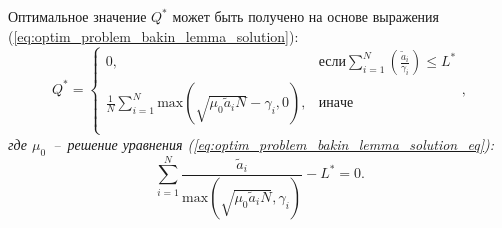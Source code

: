 \begin{lemma}
\label{lem:bakin_lemma}
Оптимальное значение $Q^{*}$ может быть получено на основе выражения (\ref{eq:optim_problem_bakin_lemma_solution}):
\emph{
\begin{equation}
Q^{*} =
\begin{cases}
0, & \text{если} \sum\limits_{i=1}^{N} {\left(\frac{\tilde{a}_i}{\gamma_i}\right)} \leq L^{*}\\
\frac{1}{N} \sum\limits_{i=1}^{N} {\mathrm{max} \left(\sqrt{\mu_0 \tilde{a}_i N}-\gamma_i, 0\right)}, & \mathrm{иначе} \\
\end{cases},
\label{eq:optim_problem_bakin_lemma_solution}
\end{equation}
}
\emph{
где $\mu_0$~--~решение уравнения (\ref{eq:optim_problem_bakin_lemma_solution_eq}):
\begin{equation}
\sum\limits_{i=1}^{N} {\frac{\tilde{a}_i}{\mathrm{max} \left(\sqrt{\mu_0 \tilde{a}_i N}, \gamma_i\right)}} - L^{*} = 0.
\label{eq:optim_problem_bakin_lemma_solution_eq}
\end{equation}
}
\end{lemma}


